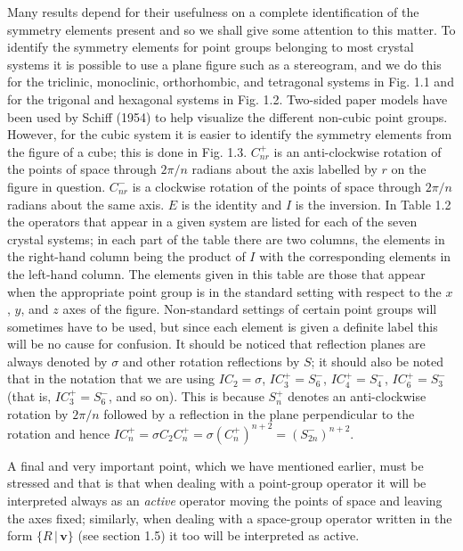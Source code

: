 \documentclass[11pt,a4paper,twoside,openright]{book}
\begin{document}
Many results depend for their usefulness on a complete identification of the symmetry elements present and so we shall give some attention to this matter. To identify the symmetry elements for point groups belonging to most crystal systems it is possible to use a plane figure such as a stereogram, and we do this for the triclinic, monoclinic, orthorhombic, and tetragonal systems in Fig. 1.1 and for the trigonal and hexagonal systems in Fig. 1.2. Two-sided paper models have been used by Schiff (1954) to help visualize the different non-cubic point groups. However, for the cubic system it is easier to identify the symmetry elements from the figure of a cube; this is done in Fig. 1.3. $C_{nr}^{+}$ is an anti-clockwise rotation of the points of space through $2\pi/n$ radians about the axis labelled by $r$ on the figure in question. $C_{nr}^{-}$ is a clockwise rotation of the points of space through $2\pi/n$ radians about the same axis. $E$ is the identity and $I$ is the inversion. In Table 1.2 the operators that appear in a given system are listed for each of the seven crystal systems; in each part of the table there are two columns, the elements in the right-hand column being the product of $I$ with the corresponding elements in the left-hand column. The elements given in this table are those that appear when the appropriate point group is in the standard setting with respect to the $x$, $y$, and $z$ axes of the figure. Non-standard settings of certain point groups will sometimes have to be used, but since each element is given a definite label this will be no cause for confusion. It should be noticed that reflection planes are always denoted by $\sigma$ and other rotation reflections by $S$; it should also be noted that in the notation that we are using $IC_{2} = \sigma$, $IC_{3}^{+} = S_{6}^{-}$, $IC_{4}^{+} = S_{4}^{-}$, $IC_{6}^{+} = S_{3}^{-}$ (that is, $IC_{3}^{+} = S_{6}^{-}$, and so on). This is because $S_{n}^{+}$ denotes an anti-clockwise rotation by $2\pi/n$ followed by a reflection in the plane perpendicular to the rotation and hence $IC_{n}^{+} = \sigma C_{2}C_{n}^{+} = \sigma(C_{n}^{+})^{n+2} = (S_{2n}^{-})^{n+2}$.

A final and very important point, which we have mentioned earlier, must be stressed and that is that when dealing with a point-group operator it will be interpreted always as an \textit{active} operator moving the points of space and leaving the axes fixed; similarly, when dealing with a space-group operator written in the form $\{R \,|\, \mathbf{v}\}$ (see section 1.5) it too will be interpreted as active.
\end{document}
